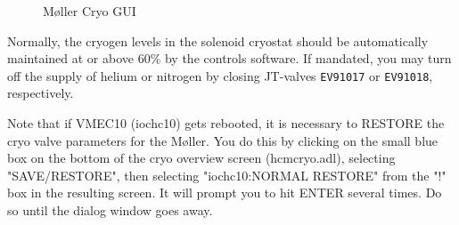 \begin{figure}
\begin{center}
\caption{M\o ller Cryo GUI\label{molcryomedm}}
\end{center}
\end{figure}
%

Normally, the cryogen levels in the solenoid cryostat should be
automatically maintained at or above 60\% by the controls software.
If mandated, you may turn off the supply of helium or nitrogen by
closing JT-valves {\tt EV91017} or {\tt EV91018}, respectively.

Note that if VMEC10 (iochc10) gets rebooted, it is necessary to RESTORE the cryo valve
parameters for the M\o ller. You do this by clicking on the small blue box on the
bottom of the cryo overview screen (hcmcryo.adl), selecting "SAVE/RESTORE",
then selecting "iochc10:NORMAL RESTORE" from the "!" box in the resulting
screen. It will prompt you to hit ENTER several times. Do so until the dialog
window goes away.

